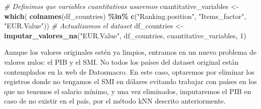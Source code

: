 \documentclass[
]{article}
\newenvironment{Shaded}{\begin{snugshade}}{\end{snugshade}}
\newcommand{\CommentTok}[1]{\textcolor[rgb]{0.56,0.35,0.01}{\textit{#1}}}
\newcommand{\DecValTok}[1]{\textcolor[rgb]{0.00,0.00,0.81}{#1}}
\newcommand{\FunctionTok}[1]{\textcolor[rgb]{0.13,0.29,0.53}{\textbf{#1}}}
\newcommand{\NormalTok}[1]{#1}
\newcommand{\OtherTok}[1]{\textcolor[rgb]{0.56,0.35,0.01}{#1}}
\newcommand{\SpecialCharTok}[1]{\textcolor[rgb]{0.81,0.36,0.00}{\textbf{#1}}}
\newcommand{\StringTok}[1]{\textcolor[rgb]{0.31,0.60,0.02}{#1}}
\begin{document}
\begin{Shaded}
\begin{Highlighting}[]
\CommentTok{\# Definimos que variables cuantitativas usaremos}
\NormalTok{cuantitative\_variables }\OtherTok{\textless{}{-}} \FunctionTok{which}\NormalTok{( }\FunctionTok{colnames}\NormalTok{(df\_countries) }\SpecialCharTok{\%in\%} \FunctionTok{c}\NormalTok{(}\StringTok{"Ranking.position"}\NormalTok{, }
                                                               \StringTok{"Items\_factor"}\NormalTok{, }
                                                               \StringTok{"EUR.Value"}\NormalTok{))}
\CommentTok{\# Actualizamos el dataset}
\NormalTok{df\_countries }\OtherTok{\textless{}{-}} \FunctionTok{imputar\_valores\_na}\NormalTok{(}\StringTok{"EUR.Value"}\NormalTok{, }
\NormalTok{                                   df\_countries, }
\NormalTok{                                   cuantitative\_variables, }
                                   \DecValTok{1}\NormalTok{)}
\end{Highlighting}
\end{Shaded}

Aunque los valores originales estén ya limpios, entramos en un nuevo
problema de valores nulos: el PIB y el SMI. No todos los países del
dataset original están contemplados en la web de Datosmacro. En este
caso, optaremos por eliminar los registros donde no tengamos el SMI en
dólares evitando trabajar con países en los que no tenemos el salario
mínimo, y una vez eliminados, imputaremos el PIB en caso de no existir
en el país, por el método kNN descrito anteriormente.

\begin{Shaded}
\end{Shaded}
\end{document}
